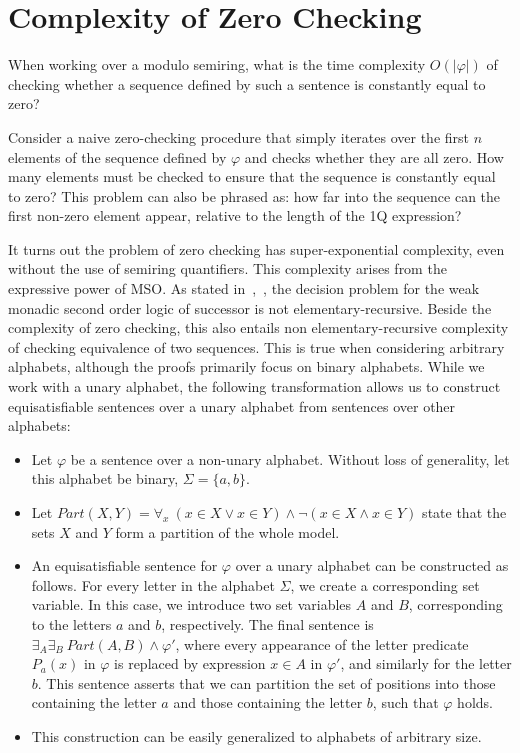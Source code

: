 \documentclass[en]{pracamgr}
\theoremstyle{definition}
\begin{document}
\section{Complexity of Zero Checking}
When working over a modulo semiring, what is the time complexity $O(|\varphi|)$ of checking whether a sequence defined by such a sentence is constantly equal to zero?

Consider a naive zero-checking procedure that simply iterates over the first $n$ elements of the sequence defined by $\varphi$ and checks whether they are all zero. How many elements must be checked to ensure that the sequence is constantly equal to zero? This problem can also be phrased as: how far into the sequence can the first non-zero element appear, relative to the length of the 1Q expression?

It turns out the problem of zero checking has super-exponential complexity, even without the use of semiring quantifiers. This complexity arises from the expressive power of MSO. As stated in~\cite{Stockmeyer},~\cite{Meyer}, the decision problem for the weak monadic second order logic of successor is not elementary-recursive. Beside the complexity of zero checking, this also entails non elementary-recursive complexity of checking equivalence of two sequences. This is true when considering arbitrary alphabets, although the proofs primarily focus on binary alphabets. While we work with a unary alphabet, the following transformation allows us to construct equisatisfiable sentences over a unary alphabet from sentences over other alphabets:

\begin{itemize}
    \item Let $\varphi$ be a sentence over a non-unary alphabet. Without loss of generality, let this alphabet be binary, $\Sigma = \{a,b\}$.
    \item Let $Part(X,Y) = \forall_x \ (x \in X \lor x \in Y) \land \neg(x \in X \land x \in Y)$ state that the sets $X$ and $Y$ form a partition of the whole model.
    \item An equisatisfiable sentence for $\varphi$ over a unary alphabet can be constructed as follows. For every letter in the alphabet $\Sigma$, we create a corresponding set variable. In this case, we introduce two set variables $A$ and $B$, corresponding to the letters $a$ and $b$, respectively. The final sentence is $\exists_A\exists_B \ Part(A,B) \land \varphi'$, where every appearance of the letter predicate $P_a(x)$ in $\varphi$ is replaced by expression $x \in A$ in $\varphi'$, and similarly for the letter $b$. This sentence asserts that we can partition the set of positions into those containing the letter $a$ and those containing the letter $b$, such that $\varphi$ holds.
    \item This construction can be easily generalized to alphabets of arbitrary size.
\end{itemize}
\end{document}
